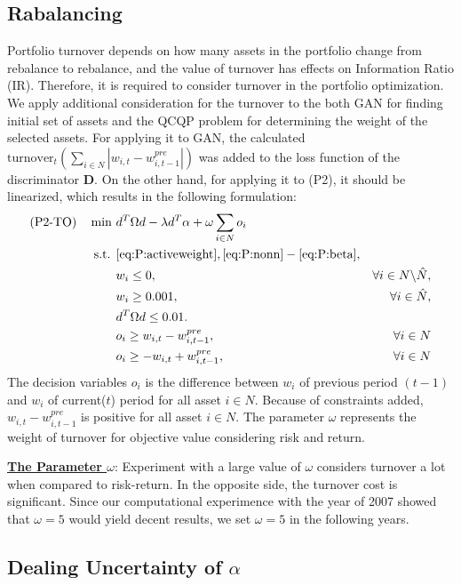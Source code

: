 \documentclass[11pt]{article}
\begin{document}
	\subsection{Rabalancing}
	
	Portfolio turnover depends on how many assets in the portfolio change from rebalance to rebalance, and the value of turnover has effects on Information Ratio (IR). Therefore, it is required to consider turnover in the portfolio optimization. We apply additional consideration for the turnover to the both GAN for finding initial  set of assets and the QCQP problem for determining the weight of the selected assets. For applying it to GAN, the calculated $\text{turnover}_{t} (\sum_{i \in N}|w_{i,t}-w_{i,t-1}^{pre}|)$ was added to the loss function of the discriminator \textbf{D}. On the other hand, for applying it to (P2), it should be linearized, which results in the following formulation:
	\begin{align*}
	\text{(P2-TO)} \quad \min~ & d^T\Omega d  -  \lambda d^{T}\alpha + \omega \sum_{i \in N}o_i \\
	\text{s.t. } 
	& \eqref{eq:P:activeweight}, \eqref{eq:P:nonn} - \eqref{eq:P:beta}, \notag\\
	& w_i \le 0, & \forall i \in N \backslash \hat{N}, \\
	& w_i \geq 0.001, & \forall i \in \hat{N}, \\
	& d^T \Omega d \leq 0.01. \\
	& o_i \geq w_{i,t}-w_{i,t-1}^{pre}, & \forall{i \in N} \\
	& o_i \geq -w_{i,t}+w_{i,t-1}^{pre}, & \forall{i \in N} 
	\end{align*} 
	The decision variables $o_i$ is the difference between $w_i$ of previous period $(t-1)$ and $w_i$ of current($t$) period for all asset $i \in N$. Because of constraints added, $ w_{i,t}-w_{i,t-1}^{pre}$ is positive for all asset $i \in N$. The parameter $\omega$ represents the weight of turnover for objective value considering risk and return. 
	
	\underline{\textbf{The Parameter $ \omega$}}: Experiment with a large value of $ \omega $ considers turnover a lot when compared to risk-return. In the opposite side, the turnover cost is significant. Since our computational experimence with the year of 2007 showed that $\omega=5$ would yield decent results, we set $\omega=5$ in the following years.
	
	
	
	
	\subsection{Dealing Uncertainty of $\alpha$} 
	
\end{document}
